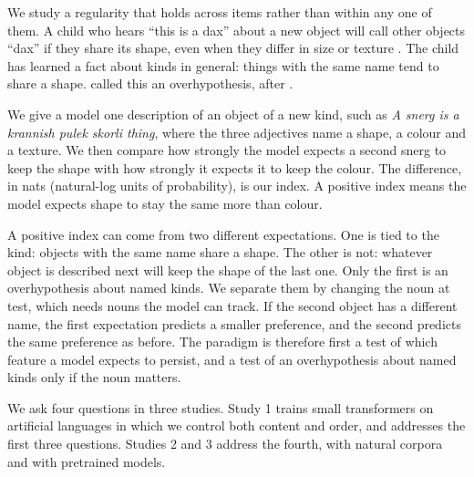 We study a regularity that holds across items rather than within any one of them. A child who hears ``this is a dax'' about a new object will call other objects ``dax'' if they share its shape, even when they differ in size or texture \cite{landau1988}. The child has learned a fact about kinds in general: things with the same name tend to share a shape. \citet{kemp2007} called this an overhypothesis, after \citet{goodman1955}.

We give a model one description of an object of a new kind, such as \emph{A snerg is a krannish pulek skorli thing}, where the three adjectives name a shape, a colour and a texture. We then compare how strongly the model expects a second snerg to keep the shape with how strongly it expects it to keep the colour. The difference, in nats (natural-log units of probability), is our index. A positive index means the model expects shape to stay the same more than colour.

A positive index can come from two different expectations. One is tied to the kind: objects with the same name share a shape. The other is not: whatever object is described next will keep the shape of the last one. Only the first is an overhypothesis about named kinds. We separate them by changing the noun at test, which needs nouns the model can track. If the second object has a different name, the first expectation predicts a smaller preference, and the second predicts the same preference as before. The paradigm is therefore first a test of which feature a model expects to persist, and a test of an overhypothesis about named kinds only if the noun matters.

We ask four questions in three studies. Study 1 trains small transformers on artificial languages in which we control both content and order, and addresses the first three questions. Studies 2 and 3 address the fourth, with natural corpora and with pretrained models.

